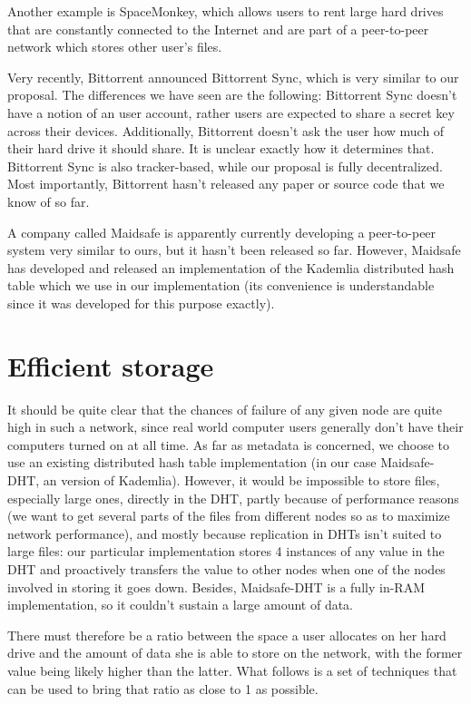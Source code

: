 \documentclass[11pt]{IEEEtran}
\begin{document}
Another example is SpaceMonkey\cite{spacemonkey}, which allows users to rent large hard drives that are constantly connected to the Internet and are part of a peer-to-peer network which stores other user's files.

Very recently, Bittorrent announced Bittorrent Sync\cite{sync}, which is very similar to our proposal. The differences we have seen are the following: Bittorrent Sync doesn't have a notion of an user account, rather users are expected to share a secret key across their devices. Additionally, Bittorrent doesn't ask the user how much of their hard drive it should share. It is unclear exactly how it determines that. Bittorrent Sync is also tracker-based, while our proposal is fully decentralized. Most importantly, Bittorrent hasn't released any paper or source code that we know of so far.

A company called Maidsafe is apparently currently developing a peer-to-peer system very similar to ours\cite{maidsafe_site}, but it hasn't been released so far. However, Maidsafe has developed and released an implementation of the Kademlia distributed hash table\cite{maidsafe_dht} which we use in our implementation (its convenience is understandable since it was developed for this purpose exactly).

\section{Efficient storage}

It should be quite clear that the chances of failure of any given node are quite high in such a network, since real world computer users generally don't have their computers turned on at all time. As far as metadata is concerned, we choose to use an existing distributed hash table implementation (in our case Maidsafe-DHT, an version of Kademlia). However, it would be impossible to store files, especially large ones, directly in the DHT, partly because of performance reasons (we want to get several parts of the files from different nodes so as to maximize network performance), and mostly because replication in DHTs isn't suited to large files: our particular implementation stores 4 instances of any value in the DHT and proactively transfers the value to other nodes when one of the nodes involved in storing it goes down. Besides, Maidsafe-DHT is a fully in-RAM implementation, so it couldn't sustain a large amount of data.

There must therefore be a ratio between the space a user allocates on her hard drive and the amount of data she is able to store on the network, with the former value being likely higher than the latter. What follows is a set of techniques that can be used to bring that ratio as close to 1 as possible.
\end{document}
